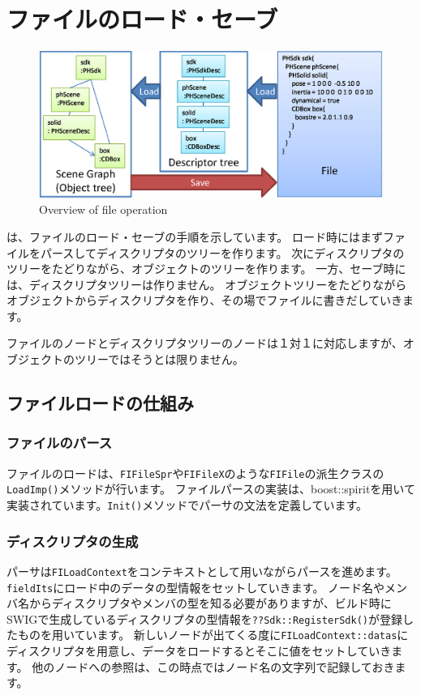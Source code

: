 \section{ファイルのロード・セーブ}
\begin{figure}
\begin{center}
\includegraphics*[width=.95\hsize]{fig/fileOperation.eps}
\end{center}
\caption{Overview of file operation}
\label{fig_fileOperation}
\end{figure}

は、ファイルのロード・セーブの手順を示しています。
\KLUDGE ロード時にはまずファイルをパースしてディスクリプタのツリーを作ります。
\KLUDGE 次にディスクリプタのツリーをたどりながら、オブジェクトのツリーを作ります。
\KLUDGE 一方、セーブ時には、ディスクリプタツリーは作りません。
\KLUDGE オブジェクトツリーをたどりながらオブジェクトからディスクリプタを作り、その場でファイルに書きだしていきます。

\KLUDGE ファイルのノードとディスクリプタツリーのノードは１対１に対応しますが、オブジェクトのツリーではそうとは限りません。

\subsection{ファイルロードの仕組み}
\subsubsection{ファイルのパース}
\KLUDGE ファイルのロードは、\texttt{FIFileSpr}や\texttt{FIFileX}のような\texttt{FIFile}の派生クラスの\texttt{LoadImp()}メソッドが行います。
\KLUDGE ファイルパースの実装は、boost::spiritを用いて実装されています。\texttt{Init()}メソッドでパーサの文法を定義しています。
\subsubsection{ディスクリプタの生成}
\KLUDGE パーサは\texttt{FILoadContext}をコンテキストとして用いながらパースを進めます。
\texttt{fieldIts}にロード中のデータの型情報をセットしていきます。
\KLUDGE ノード名やメンバ名からディスクリプタやメンバの型を知る必要がありますが、ビルド時にSWIGで生成しているディスクリプタの型情報を\texttt{??Sdk::RegisterSdk()}が登録したものを用いています。
\KLUDGE 新しいノードが出てくる度に\texttt{FILoadContext::datas}にディスクリプタを用意し、データをロードするとそこに値をセットしていきます。
\KLUDGE 他のノードへの参照は、この時点ではノード名の文字列で記録しておきます。

